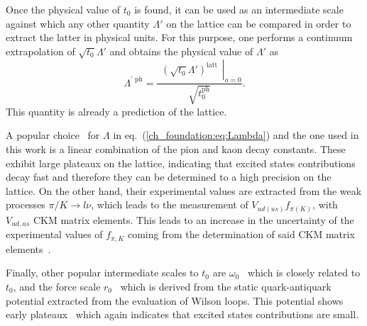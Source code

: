 Once the physical value of $t_0$ is found, it can be used as an intermediate scale against which any other quantity $\Lambda'$ on the lattice can be compared in order to extract the latter in physical units. For this purpose, one performs a continuum extrapolation of $\sqrt{t_0}\Lambda'$ and obtains the physical value of $\Lambda'$ as
\begin{equation}
\Lambda^{\textrm{' ph}}=\frac{\left.\begin{matrix}
\left(\sqrt{t_0}\Lambda'\right)^{\textrm{latt}}
\end{matrix}\right|_{a=0}}{\sqrt{t_0^{\textrm{ph}}}}.
\end{equation}
This quantity is already a prediction of the lattice.

A popular choice~\citep{Brown:2018jtv,BMW:2012hcm,BMW:2012hcm,Bruno:2016plf,Strassberger:2023xnj} for $\Lambda$ in eq.~(\ref{ch_foundation:eq:Lambda}) and the one used in this work is a linear combination of the pion and kaon decay constants. These exhibit large plateaux on the lattice, indicating that excited states contributions decay fast and therefore they can be determined to a high precision on the lattice. On the other hand, their experimental values are extracted from the weak processes $\pi/K\to l\nu$, which leads to the measurement of $V_{ud(us)}f_{\pi(K)}$, with $V_{ud,us}$ CKM matrix elements. This leads to an increase in the uncertainty of the experimental values of $f_{\pi,K}$ coming from the determination of said CKM matrix elements~\citep{FlavourLatticeAveragingGroupFLAG:2021npn}.

Finally, other popular intermediate scales to $t_0$ are $\omega_0$~\citep{BMW:2012hcm,Kostrzewa:2021syw,MILC:2015tqx} which is closely related to $t_0$, and the force scale $r_0$~\citep{Sommer:1993ce,Necco:2001xg,Bernard:2000gd} which is derived from the static quark-antiquark potential extracted from the evaluation of Wilson loops. This potential shows early plateaux~\citep{Sommer:2014mea} which again indicates that excited states contributions are small.

